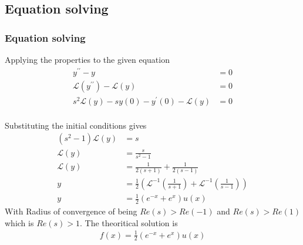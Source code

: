 \documentclass{beamer}
\providecommand{\brak}[1]{\ensuremath{\left(#1\right)}}
\theoremstyle{remark}
\numberwithin{equation}{section}
\begin{document}
\subsection{Equation solving}
\begin{frame}
\frametitle{Equation solving}
Applying the properties to the given equation
\begin{align}
	y^{\prime\prime} - y &= 0\\
	\mathcal{L}\brak{y^{\prime\prime}} - \mathcal{L}\brak{y} &= 0\\
	s^2\mathcal{L}\brak{y} -sy\brak{0}-y^\prime\brak{0}-\mathcal{L}\brak{y} &= 0\\
\end{align}
\end{frame}
\begin{frame}
Substituting the initial conditions gives
\begin{align}
	\brak{s^2-1}\mathcal{L}\brak{y}&= s\\
	\mathcal{L}\brak{y} &= \frac{s}{s^2 - 1}\\
	 \mathcal{L}\brak{y} &= \frac{1}{2\brak{s+1}}+\frac{1}{2\brak{s-1}}\\
	y &= \frac{1}{2}\brak{\mathcal{L}^{-1}\brak{\frac{1}{s+1}}+\mathcal{L}^{-1}\brak{\frac{1}{s-1}}}\\
	y &= \frac{1}{2}\brak{e^{-x}+e^{x}}u\brak{x}
\end{align}
With Radius of convergence of being $Re\brak{s}>Re\brak{-1}$ and $Re\brak{s}>Re\brak{1}$ which is $Re\brak{s}>1$.\newline
The theoritical solution is 
\begin{align}
	f\brak{x} = \frac{1}{2}\brak{e^{-x}+e^{x}}u\brak{x}
\end{align}
\end{frame}
\end{document}
